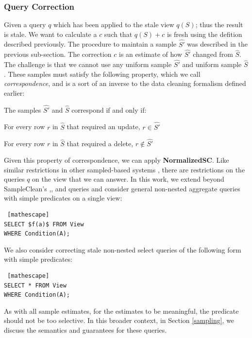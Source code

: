 \subsubsection{Query Correction}

Given a query $q$ which has been applied to the stale view $q(S)$; thus the result is stale.
We want to calculate a $c$  such that $q(S)+c$ is fresh using the defition described previously.
The procedure to maintain a sample $\hat{S'}$ was described in the previous sub-section.
The correction $c$ is an estimate of how $\hat{S'}$ changed from $\hat{S}$.
The challenge is that we cannot use any uniform sample $\hat{S'}$ and uniform sample $\hat{S}$.
These samples must satisfy the following property, which we call \emph{correspondence}, and is a sort of an inverse to the 
data cleaning formalism defined earlier:



\begin{definition}[Correspondence]
The samples $\hat{S'}$ and $\hat{S}$ correspond if and only if:
\item For every row $r$ in $\hat{S}$ that required an update, $r\in \hat{S'}$
\item For every row $r$ in $\hat{S}$ that required a delete, $r \not\in \hat{S'}$
\end{definition}




Given this property of correspondence, we can apply \textbf{NormalizedSC}.
Like similar restrictions in other sampled-based systems \cite{agarwalknowing}, there are restrictions on the queries $q$ on the view that we can answer. 
In this work, we extend beyond SampleClean's \sumfunc,\countfunc, and \avgfunc queries and consider general non-nested aggregate queries with simple predicates on a single view:
\begin{lstlisting} [mathescape]
SELECT $f(a)$ FROM View 
WHERE Condition(A);
\end{lstlisting}
We also consider correcting stale non-nested select queries of the following form with simple predicates:
\begin{lstlisting} [mathescape]
SELECT * FROM View 
WHERE Condition(A);
\end{lstlisting}
As with all sample estimates, for the estimates to be meaningful, the predicate should not be too selective. 
In this broader context, in Section \ref{sampling}, we discuss the semantics and guarantees for these queries.

